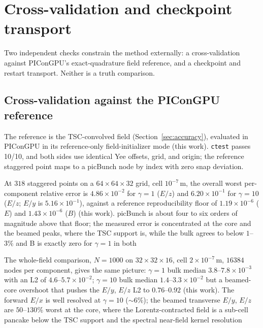 \section{Cross-validation and checkpoint transport}
\label{sec:comparison}

Two independent checks constrain the method externally: a cross-validation
against PIConGPU's exact-quadrature field reference, and a checkpoint and
restart transport. Neither is a truth comparison.

\subsection{Cross-validation against the PIConGPU reference}

The reference is the TSC-convolved field (Section~\ref{sec:accuracy}),
evaluated in PIConGPU \citep{burau2010} in its reference-only
field-initializer mode (this work). \texttt{ctest} passes 10/10, and both
sides use identical Yee offsets, grid, and origin; the
reference staggered point maps to a picBunch node by index with zero snap
deviation.

At $318$ staggered points on a $64\times64\times32$ grid, cell
$10^{-7}$\,m, the overall worst per-component relative error is
$4.86\times10^{-2}$ for $\gamma=1$ ($E/z$) and $6.20\times10^{-1}$ for
$\gamma=10$ ($E/z$; $E/y$ is $5.16\times10^{-1}$), against a reference
reproducibility floor of $1.19\times10^{-6}$ ($E$) and
$1.43\times10^{-6}$ ($B$) (this work). picBunch is about four to six
orders of magnitude above that floor; the measured error is concentrated at
the core and the beamed peaks, where the TSC support is, while the bulk
agrees to below $1$--$3\%$ and B is exactly zero for $\gamma=1$ in both


The whole-field comparison, $N=1000$ on $32\times32\times16$, cell
$2\times10^{-7}$\,m, $16384$ nodes per component, gives the same picture:
$\gamma=1$ bulk median $3.8$--$7.8\times10^{-3}$ with an L2 of
$4.6$--$5.7\times10^{-2}$; $\gamma=10$ bulk median $1.4$--$3.3\times10^{-2}$
but a beamed-core overshoot that pushes the $E/y$, $E/z$ L2 to
$0.76$--$0.92$ (this work). The forward $E/x$ is well resolved at
 $\gamma=10$ ($\sim6\%$); the beamed transverse $E/y$, $E/z$ are
$50$--$130\%$ worst at the core, where the Lorentz-contracted field is a
sub-cell pancake below the TSC support and the spectral near-field kernel
resolution

